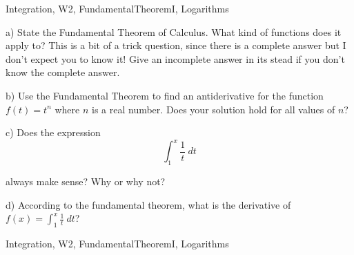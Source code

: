 \begin{tagblock}{Integration, W2, FundamentalTheoremI, Logarithms}
\begin{question}
	 a) State the Fundamental Theorem of Calculus. What kind of functions does it apply to? This is a bit of a trick question, since there is a complete answer but I don't expect you to know it! Give an incomplete answer in its stead if you don't know the complete answer. 


\bigskip

b) Use the Fundamental Theorem to find an antiderivative for the function $f(t)=t^{n}$ where $n$ is a real number. Does your solution hold for all values of $n$?

\bigskip

\bigskip

c) Does the expression
\[
\int_1^x \frac 1 t \ dt 
\]

always make sense? Why or why not? 

\bigskip

d) According to the fundamental theorem, what is the derivative of $f(x)=\displaystyle\int^x_1 \frac 1 t \ dt$?
	
	
\begin{tags}
	   Integration, W2, FundamentalTheoremI, Logarithms
\end{tags}
	
\begin{diary}
	   
\end{diary}
	
\begin{solution}
	   
	    \end{enumerate}
\end{solution}
	
\end{question}

\end{tagblock}

